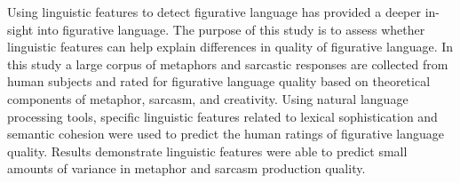 Using linguistic features to detect figurative language has provided a deeper in-sight into figurative language. The purpose of this study is to assess whether linguistic features can help explain differences in quality of figurative language. In this study a large corpus of metaphors and sarcastic responses are collected from human subjects and rated for figurative language quality based on theoretical components of metaphor, sarcasm, and creativity. Using natural language processing tools, specific linguistic features related to lexical sophistication and semantic cohesion were used to predict the human ratings of figurative language quality. Results demonstrate linguistic features were able to predict small amounts of variance in metaphor and sarcasm production quality.
